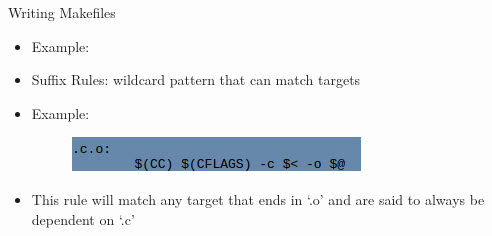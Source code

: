 \documentclass{beamer}
\begin{document}
\begin{frame}{Writing Makefiles}
\begin{itemize}
	\item Example:
	\begin{figure}
	\end{figure}
	\item Suffix Rules: wildcard pattern that can match targets
	\item Example:
	\begin{figure}
		\includegraphics[scale=0.4]{./Figures/SuffixRulesExample.png}
	\end{figure}
	\item This rule will match any target that ends in `.o' and are said to always be dependent on `.c'
\end{itemize}
\end{frame}
\end{document}
